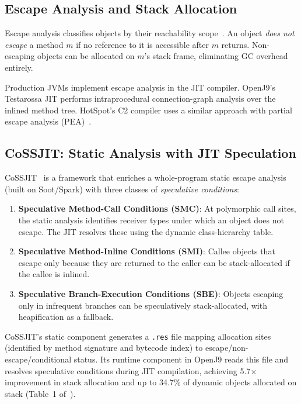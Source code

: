 \documentclass[12pt,a4paper]{article}
\begin{document}
\subsection{Escape Analysis and Stack Allocation}

Escape analysis classifies objects by their reachability scope~\cite{choi1999escape}. An object \emph{does not escape} a method $m$ if no reference to it is accessible after $m$ returns. Non-escaping objects can be allocated on $m$'s stack frame, eliminating GC overhead entirely.

Production JVMs implement escape analysis in the JIT compiler. OpenJ9's Testarossa JIT performs intraprocedural connection-graph analysis over the inlined method tree. HotSpot's C2 compiler uses a similar approach with partial escape analysis (PEA)~\cite{stadler2014pea}.

\subsection{CoSSJIT: Static Analysis with JIT Speculation}

CoSSJIT~\cite{cossjit2025} is a framework that enriches a whole-program static escape analysis (built on Soot/Spark) with three classes of \emph{speculative conditions}:

\begin{enumerate}
  \item \textbf{Speculative Method-Call Conditions (SMC)}: At polymorphic call sites, the static analysis identifies receiver types under which an object does not escape. The JIT resolves these using the dynamic class-hierarchy table.
  \item \textbf{Speculative Method-Inline Conditions (SMI)}: Callee objects that escape only because they are returned to the caller can be stack-allocated if the callee is inlined.
  \item \textbf{Speculative Branch-Execution Conditions (SBE)}: Objects escaping only in infrequent branches can be speculatively stack-allocated, with heapification as a fallback.
\end{enumerate}

CoSSJIT's static component generates a \texttt{.res} file mapping allocation sites (identified by method signature and bytecode index) to escape/non-escape/conditional status. Its runtime component in OpenJ9 reads this file and resolves speculative conditions during JIT compilation, achieving 5.7$\times$ improvement in stack allocation and up to 34.7\% of dynamic objects allocated on stack (Table~1 of~\cite{cossjit2025}).
\end{document}
